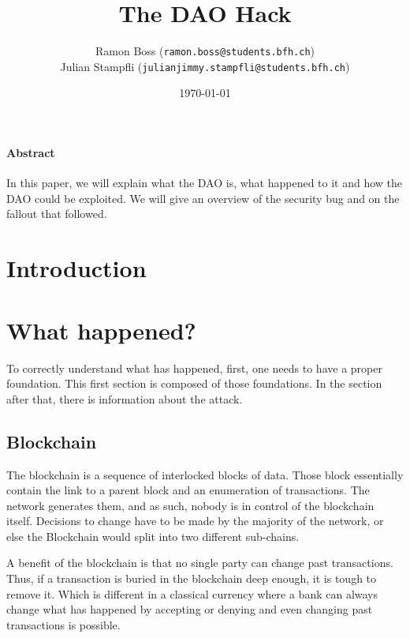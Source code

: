 \documentclass[a4paper, 11pt]{scrartcl}
\begin{document}
\title{The DAO Hack}
\date{\today}   %
\author{
  Ramon Boss (\texttt{ramon.boss@students.bfh.ch}) \\
  Julian Stampfli (\texttt{julianjimmy.stampfli@students.bfh.ch})
}

\maketitle

\paragraph{Abstract}

In this paper, we will explain what the DAO is, what happened to it and how the DAO could be exploited.
We will give an overview of the security bug and on the fallout that followed.

\setcounter{tocdepth}{2}
\tableofcontents
\clearpage

\section{Introduction}

\section{What happened?}

To correctly understand what has happened, first, one needs to have a proper foundation.
This first section is composed of those foundations. In the section after that, there is information about the attack.

\subsection{Blockchain}

The blockchain is a sequence of interlocked blocks of data.
Those block essentially contain the link to a parent block and an enumeration of transactions. The network generates them, and as such, nobody is in control of the blockchain itself.
Decisions to change have to be made by the majority of the network, or else the Blockchain would split into two different sub-chains. \cite{blockchainKai}

A benefit of the blockchain is that no single party can change past transactions.
Thus, if a transaction is buried in the blockchain deep enough, it is tough to remove it. Which is different in a classical currency where a bank can always change what has happened by accepting or denying and even changing past transactions is possible. \cite{blockchainKai}
\end{document}

